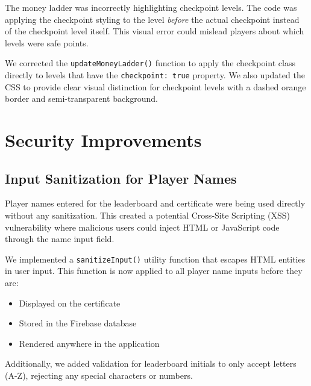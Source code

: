 \documentclass[11pt,a4paper]{article}
\begin{document}
\begin{issuebox}
The money ladder was incorrectly highlighting checkpoint levels. The code was applying the checkpoint styling to the level \textit{before} the actual checkpoint instead of the checkpoint level itself. This visual error could mislead players about which levels were safe points.
\end{issuebox}

\begin{fixbox}
We corrected the \texttt{updateMoneyLadder()} function to apply the checkpoint class directly to levels that have the \texttt{checkpoint: true} property. We also updated the CSS to provide clear visual distinction for checkpoint levels with a dashed orange border and semi-transparent background.
\end{fixbox}

\section{Security Improvements}

\subsection{Input Sanitization for Player Names}

\begin{issuebox}
Player names entered for the leaderboard and certificate were being used directly without any sanitization. This created a potential Cross-Site Scripting (XSS) vulnerability where malicious users could inject HTML or JavaScript code through the name input field.
\end{issuebox}

\begin{fixbox}
We implemented a \texttt{sanitizeInput()} utility function that escapes HTML entities in user input. This function is now applied to all player name inputs before they are:
\begin{itemize}
    \item Displayed on the certificate
    \item Stored in the Firebase database
    \item Rendered anywhere in the application
\end{itemize}
Additionally, we added validation for leaderboard initials to only accept letters (A-Z), rejecting any special characters or numbers.
\end{fixbox}
\end{document}
